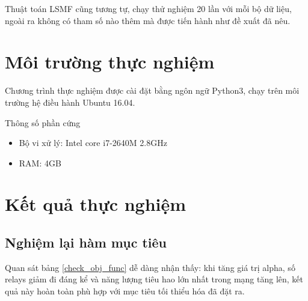 Thuật toán LSMF cũng tương tự, chạy thử nghiệm 20 lần với mỗi bộ dữ liệu, ngoài ra không có tham số nào thêm mà được tiến hành như đề xuất đã nêu.

\section{Môi trường thực nghiệm}
Chương trình thực nghiệm được cài đặt bằng ngôn ngữ Python3, chạy trên môi trường hệ điều hành Ubuntu 16.04.

Thông số phần cứng 
\begin{itemize}
    \item Bộ vi xử lý: Intel core i7-2640M 2.8GHz
    \item RAM: 4GB    
\end{itemize}

\section{Kết quả thực nghiệm}
\subsection{Nghiệm lại hàm mục tiêu}
Quan sát bảng \ref{check_obj_func} dễ dàng nhận thấy: khi tăng giá trị alpha, số relays giảm đi đáng kể và năng lượng tiêu hao lớn nhất trong mạng tăng lên, kết quả này hoàn toàn phù hợp với mục tiêu tối thiểu hóa đã đặt ra.


